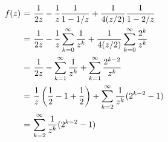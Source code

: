 \[ \everymath{\displaystyle}
\arraycolsep=1.8pt\def\arraystretch{2.5}
\begin{array}{rcl}
    f(z) & = & \frac{1}{2z} - \frac{1}{z}\frac{1}{1-1/z} + \frac{1}{4(z/2)}\frac{1}{1-2/z}\\
    & = & \frac{1}{2z} - \frac{1}{z}\sum_{k = 0}^{\infty} \frac{1}{z^k} + \frac{1}{4(z/2)} \sum_{k = 0}^{\infty} \frac{2^k}{z^k}\\
    & = & \frac{1}{2z} - \sum_{k = 1}^{\infty} \frac{1}{z^{k}} + \sum_{k = 1}^{\infty} \frac{2^{k-2}}{z^{k}}\\
    & = & \frac{1}{z} \left( \frac{1}{2} - 1 +\frac{1}{2} \right) + \sum_{k = 2}^{\infty} \frac{1}{z^{k}} (2^{k-2}-1)\\
    & = & \sum_{k = 2}^{\infty} \frac{1}{z^{k}} (2^{k-2}-1)
\end{array} \]